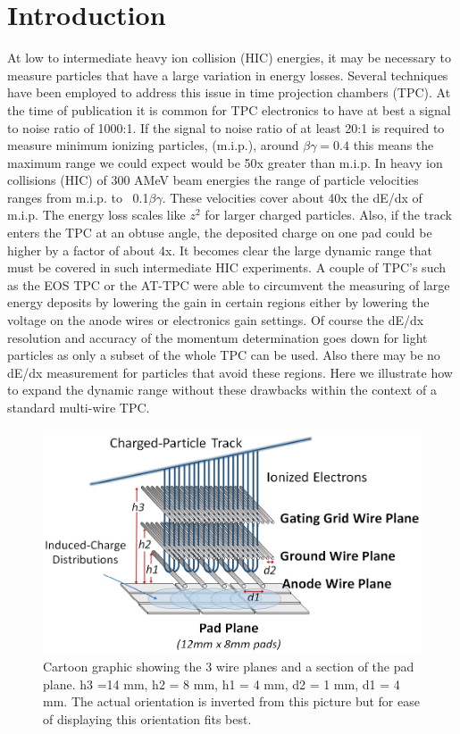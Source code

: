 \documentclass[review]{elsarticle}
\begin{document}
\section{Introduction} 
 At low to intermediate heavy ion collision (HIC) energies, it may be necessary to measure particles that have a large variation in energy losses. Several techniques have been employed to address this issue in time projection chambers (TPC). At the time of publication it is common for TPC electronics to have at best a signal to noise ratio of 1000:1. If the signal to noise ratio of at least 20:1 is required to measure minimum ionizing particles, (m.i.p.), around $\beta\gamma=0.4$ this means the maximum range we could expect would be 50x greater than m.i.p.  In heavy ion collisions (HIC) of 300 AMeV beam energies the range of particle velocities ranges from m.i.p. to ~0.1$\beta\gamma$. These velocities cover about 40x the dE/dx of m.i.p. The energy loss scales like $z^2$ for larger charged particles. Also, if the track enters the TPC at an obtuse angle, the deposited charge on one pad could be higher by a factor of about 4x.  It becomes clear the large dynamic range that must be covered in such intermediate HIC experiments. 
A couple of TPC's such as the EOS TPC or the AT-TPC were able to circumvent the measuring of large energy deposits by lowering the gain in certain regions either by lowering the voltage on the anode wires or electronics gain settings. Of course the dE/dx resolution and accuracy of the momentum determination goes down for light particles as only a subset of the whole TPC can be used. Also there may be no dE/dx measurement for particles that avoid these regions. Here we illustrate how to expand the dynamic range without these drawbacks within the context of a standard multi-wire TPC. 

\begin{figure}[ht]
\includegraphics[width=\linewidth]{padwire}
\caption{Cartoon graphic showing the 3 wire planes and a section of the pad plane. h3 =14 mm, h2 = 8 mm, h1 = 4 mm, d2 = 1 mm, d1 = 4 mm. The actual orientation is inverted from this picture but for ease of displaying this orientation fits best.}
\label{fig:padwire}
\end{figure}
\end{document}
